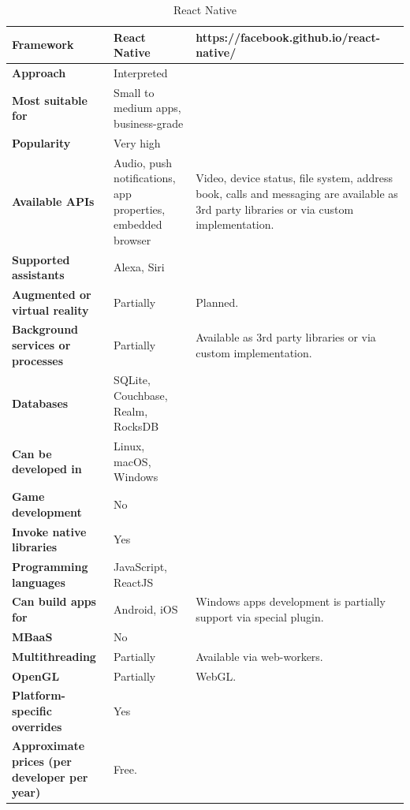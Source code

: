 \documentclass[english,master,public,dept460,male,cpdeclaration,oneside]{diploma}
\begin{document}
\begin{table}[!h]
	\centering
	\caption{React Native}
	\begin{tabular}{p{} | p{} | p{}}
		\toprule		
		\textbf{Framework} & \textbf{React Native} & https://facebook.github.io/react-native/ \\
		\midrule
		\textbf{Approach} & Interpreted & \\			
		\midrule	
		\textbf{Most suitable for} & Small to medium apps, business-grade & \\
		\midrule
		\textbf{Popularity} & Very high & \\			
		\midrule
		\textbf{Available APIs} & Audio, push notifications, app properties, embedded browser & Video, device status, file system, address book, calls and messaging are available as 3rd party libraries or via custom implementation. \\			
		\midrule
		\textbf{Supported assistants} & Alexa, Siri & \\			
		\midrule
		\textbf{Augmented or virtual reality} & Partially & Planned. \\			
		\midrule
		\textbf{Background services or processes} & Partially & Available as 3rd party libraries or via custom implementation. \\			
		\midrule
		\textbf{Databases} & SQLite, Couchbase, Realm, RocksDB & \\			
		\midrule
		\textbf{Can be developed in} & Linux, macOS, Windows &  \\			
		\midrule
		\textbf{Game development} & No & \\			
		\midrule
		\textbf{Invoke native libraries} & Yes & \\			
		\midrule
		\textbf{Programming languages} & JavaScript, ReactJS & \\			
		\midrule
		\textbf{Can build apps for} & Android, iOS & Windows apps development is partially support via special plugin. \\			
		\midrule
		\textbf{MBaaS} & No & \\			
		\midrule
		\textbf{Multithreading} & Partially & Available via web-workers. \\			
		\midrule
		\textbf{OpenGL} & Partially & WebGL. \\			
		\midrule
		\textbf{Platform-specific overrides} & Yes & \\			
		\midrule
		\textbf{Approximate prices (per developer per year)} & Free. & \\			
		\midrule
	\end{tabular}
\end{table}
\end{document}
